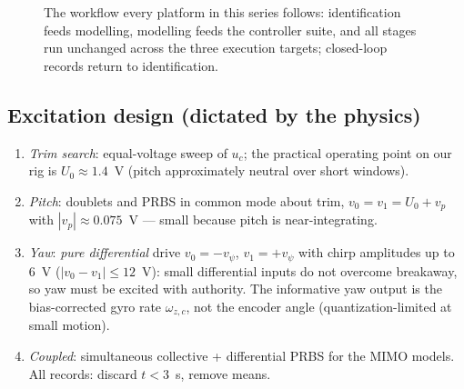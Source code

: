 \documentclass[conference]{IEEEtran}
\begin{document}
\begin{figure}[!t]
\centering
{}
\caption{The workflow every platform in this series follows: identification feeds modelling, modelling feeds the controller suite, and all stages run unchanged across the three execution targets; closed-loop records return to identification.}
\label{fig:workflow}
\end{figure}

\subsection{Excitation design (dictated by the physics)}
\begin{enumerate}[label=E\arabic*)]
\item \emph{Trim search}: equal-voltage sweep of $u_c$; the practical operating point on our rig is $U_0 \approx 1.4$~V (pitch approximately neutral over short windows).
\item \emph{Pitch}: doublets and PRBS in common mode about trim, $v_0 = v_1 = U_0 + v_p$ with $|v_p|\approx0.075$~V --- small because pitch is near-integrating.
\item \emph{Yaw}: \emph{pure differential} drive $v_0 = -v_\psi$, $v_1 = +v_\psi$ with chirp amplitudes up to 6~V ($|v_0-v_1|\le12$~V): small differential inputs do not overcome breakaway, so yaw must be excited with authority. The informative yaw output is the bias-corrected gyro rate $\omega_{z,c}$, not the encoder angle (quantization-limited at small motion).
\item \emph{Coupled}: simultaneous collective + differential PRBS for the MIMO models. All records: discard $t<3$~s, remove means.
\end{enumerate}
\end{document}
